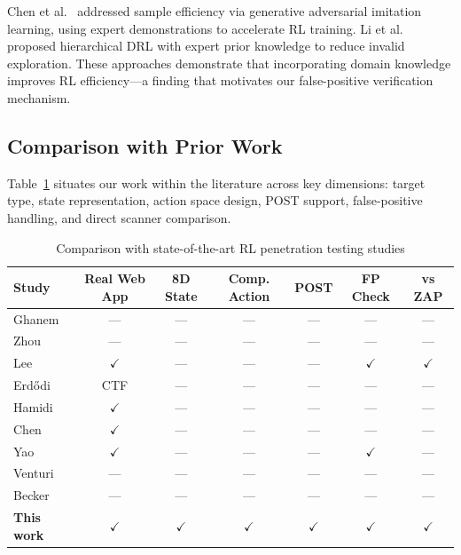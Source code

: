\documentclass[5p,twocolumn]{elsarticle}
\begin{document}
Chen et al.~\cite{gailpt2023} addressed sample efficiency via generative adversarial imitation learning, using expert demonstrations to accelerate RL training. Li et al.~\cite{li2023} proposed hierarchical DRL with expert prior knowledge to reduce invalid exploration. These approaches demonstrate that incorporating domain knowledge improves RL efficiency---a finding that motivates our false-positive verification mechanism.

\subsection{Comparison with Prior Work}

Table~\ref{tab:comparison} situates our work within the literature across key dimensions: target type, state representation, action space design, POST support, false-positive handling, and direct scanner comparison.

\begin{table}[t]
\caption{Comparison with state-of-the-art RL penetration testing studies}
\centering
\small
\label{tab:comparison}
\begin{tabular}{lcccccc}
\toprule
Study & Real Web App & 8D State & Comp. Action & POST & FP Check & vs ZAP \\
\midrule
Ghanem~\cite{ghanem2020} & --- & --- & --- & --- & --- & --- \\
Zhou~\cite{zhou2021autonomous} & --- & --- & --- & --- & --- & --- \\
Lee~\cite{lee2022} & $\checkmark$ & --- & --- & --- & $\checkmark$ & $\checkmark$ \\
Erd{\H o}di~\cite{erdodi2022} & CTF & --- & --- & --- & --- & --- \\
Hamidi~\cite{hamidi2023} & $\checkmark$ & --- & --- & --- & --- & --- \\
Chen~\cite{gailpt2023} & $\checkmark$ & --- & --- & --- & --- & --- \\
Yao~\cite{yao2023} & $\checkmark$ & --- & --- & --- & $\checkmark$ & --- \\
Venturi~\cite{venturi2024} & --- & --- & --- & --- & --- & --- \\
Becker~\cite{becker2024} & --- & --- & --- & --- & --- & --- \\
\textbf{This work} & $\checkmark$ & $\checkmark$ & $\checkmark$ & $\checkmark$ & $\checkmark$ & $\checkmark$ \\
\bottomrule
\end{tabular}
\end{table}
\end{document}
